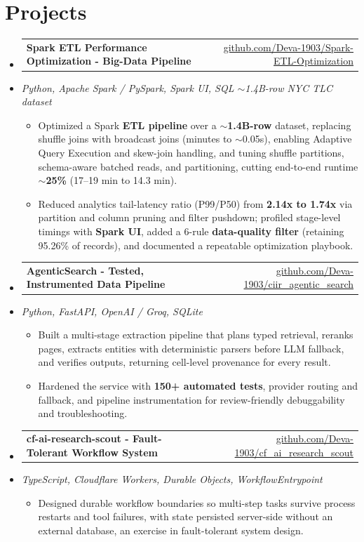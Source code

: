 \documentclass[letterpaper,10pt]{article}
\makeatletter
\newcommand{\resumeItem}[1]{
  \item\small{#1\vspace{-1pt}}
}
\newcommand{\resumeProjectHeading}[2]{
    \item
    \begin{tabular*}{0.985\textwidth}[t]{l@{\extracolsep{\fill}}r}
      \small\textbf{#1} & \small #2 \\
    \end{tabular*}\vspace{-5pt}
}
\newcommand{\resumeProjectSubheading}[1]{
  \vspace{-2pt}\item[] {\small\textcolor{ResumeSlate}{\emph{#1}}}\vspace{-3pt}
}
\newcommand{\resumeSubHeadingListStart}{\begin{itemize}[leftmargin=0.0in, label={}, itemsep=2pt, topsep=2pt]}
\newcommand{\resumeSubHeadingListEnd}{\end{itemize}}
\newcommand{\resumeItemListStart}{\begin{itemize}[leftmargin=0.18in, itemsep=2pt, topsep=1pt]}
\newcommand{\resumeItemListEnd}{\end{itemize}\vspace{-4pt}}
\makeatother
\begin{document}
\section{Projects}
\resumeSubHeadingListStart
  \resumeProjectHeading
    {Spark ETL Performance Optimization - Big-Data Pipeline}
    {\href{https://github.com/Deva-1903/Spark-ETL-Optimization}{github.com/Deva-1903/Spark-ETL-Optimization}}
  \resumeProjectSubheading{Python, Apache Spark / PySpark, Spark UI, SQL \enspace\textbar\enspace \(\sim\)1.4B-row NYC TLC dataset}
    \resumeItemListStart
      \resumeItem{Optimized a Spark \textbf{ETL pipeline} over a \textbf{\(\sim\)1.4B-row} dataset, replacing shuffle joins with broadcast joins (minutes to \(\sim\)0.05s), enabling Adaptive Query Execution and skew-join handling, and tuning shuffle partitions, schema-aware batched reads, and partitioning, cutting end-to-end runtime \textbf{\(\sim\)25\%} (17--19 min to 14.3 min).}
      \resumeItem{Reduced analytics tail-latency ratio (P99/P50) from \textbf{2.14x to 1.74x} via partition and column pruning and filter pushdown; profiled stage-level timings with \textbf{Spark UI}, added a 6-rule \textbf{data-quality filter} (retaining 95.26\% of records), and documented a repeatable optimization playbook.}
    \resumeItemListEnd
  \resumeProjectHeading
    {AgenticSearch - Tested, Instrumented Data Pipeline}
    {\href{https://github.com/Deva-1903/ciir_agentic_search}{github.com/Deva-1903/ciir\_agentic\_search}}
  \resumeProjectSubheading{Python, FastAPI, OpenAI / Groq, SQLite}
    \resumeItemListStart
      \resumeItem{Built a multi-stage extraction pipeline that plans typed retrieval, reranks pages, extracts entities with deterministic parsers before LLM fallback, and verifies outputs, returning cell-level provenance for every result.}
      \resumeItem{Hardened the service with \textbf{150+ automated tests}, provider routing and fallback, and pipeline instrumentation for review-friendly debuggability and troubleshooting.}
    \resumeItemListEnd
  \resumeProjectHeading
    {cf-ai-research-scout - Fault-Tolerant Workflow System}
    {\href{https://github.com/Deva-1903/cf_ai_research_scout}{github.com/Deva-1903/cf\_ai\_research\_scout}}
  \resumeProjectSubheading{TypeScript, Cloudflare Workers, Durable Objects, WorkflowEntrypoint}
    \resumeItemListStart
      \resumeItem{Designed durable workflow boundaries so multi-step tasks survive process restarts and tool failures, with state persisted server-side without an external database, an exercise in fault-tolerant system design.}
    \resumeItemListEnd
\resumeSubHeadingListEnd
\vspace{-4pt}
\end{document}
